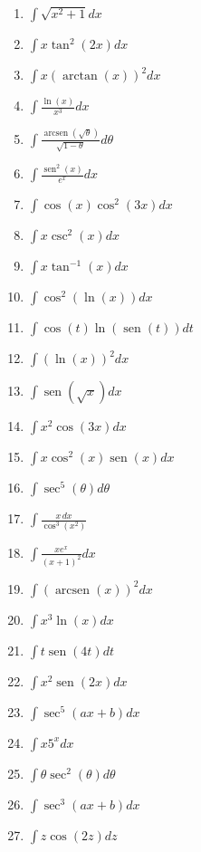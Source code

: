 \documentclass{article}
\begin{document}
\begin{multicols}{2}
\begin{enumerate}
    \item $\displaystyle \int \sqrt{x^2 + 1} dx$
    \item $\displaystyle \int x \operatorname{tan}^2 (2x) dx$
    \item $\displaystyle \int x (\operatorname{arctan} (x))^2 dx$
    \item $\displaystyle \int \frac{\ln (x)}{x^3} dx$
    \item $\displaystyle \int \frac{\operatorname{arcsen} (\sqrt{\theta})}{\sqrt{1 - \theta}} d\theta$
    \item $\displaystyle \int \frac{\operatorname{sen}^2 (x)}{e^x} dx$
    \item $\displaystyle \int \cos (x) \cos^2 (3x) dx$
    \item $\displaystyle \int x \csc^2 (x) dx$
    \item $\displaystyle \int x \tan^{-1} (x) dx$
    \item $\displaystyle \int \cos^2 (\ln (x)) dx$
    \item $\displaystyle \int \cos (t) \ln (\operatorname{sen} (t)) dt$
    \item $\displaystyle \int (\ln (x))^2 dx$
    \item $\displaystyle \int \operatorname{sen} (\sqrt{x}) dx$
    \item $\displaystyle \int x^2 \cos (3x) dx$
    \item $\displaystyle \int x \cos^2 (x) \operatorname{sen} (x) dx$
    \item $\displaystyle \int \sec^5 (\theta)d\theta$
    \item $\displaystyle \int \frac{x \, dx}{\cos^3 (x^2)}$
    \item $\displaystyle \int \frac{x e^x}{(x + 1)^2} dx$
    \item $\displaystyle \int (\operatorname{arcsen} (x))^2 dx$
    \item $\displaystyle \int x^3 \ln (x) dx$
    \item $\displaystyle \int t \operatorname{sen} (4t) dt$
    \item $\displaystyle \int x^2 \operatorname{sen} (2x) dx$
    \item $\displaystyle \int \sec^5 (ax + b) dx$
    \item $\displaystyle \int x 5^x dx$
    \item $\displaystyle \int \theta \sec^2 (\theta) d\theta$
    \item $\displaystyle \int \sec^3 (ax + b) dx$
    \item $\displaystyle \int z \cos (2z) dz$

\end{enumerate}
\end{multicols}
\end{document}

